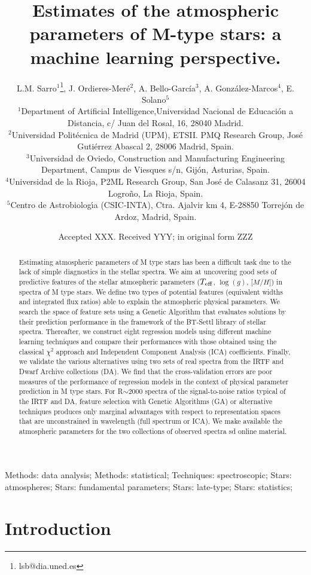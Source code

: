\documentclass[a4paper,fleqn,usenatbib]{mnras}
\title[Estimating the atmospheric parameters of M-type
  stars]{Estimates of the atmospheric parameters of M-type stars: a
  machine learning perspective.}
\author[L. M. Sarro et al.]
          {
L.M. Sarro$^{1}$\thanks{lsb@dia.uned.es},
J. Ordieres-Mer\'e$^{2}$,       
A. Bello-Garc\'ia$^{3}$, 
A. Gonz\'alez-Marcos$^{4}$, 
E. Solano$^{5}$
\\
$^{1}$Department of Artificial Intelligence,Universidad Nacional de Educaci\'{o}n a Distancia, c/ Juan del Rosal, 16, 28040 Madrid.\\
$^{2}$Universidad Polit\'{e}cnica de Madrid (UPM), ETSII. PMQ Research Group, Jos\'{e} Guti\'{e}rrez Abascal 2, 28006 Madrid, Spain. \\
$^{3}$Universidad de Oviedo, Construction and Manufacturing Engineering Department, Campus de Viesques s/n, Gij\'{o}n, Asturias, Spain. \\
$^{4}$Universidad de la Rioja, P2ML Research Group, San Jos\'{e} de Calasanz 31, 26004 Logro\~{n}o, La Rioja, Spain. \\
$^{5}$Centro de Astrobiolog\'{\i}a (CSIC-INTA), Ctra. Ajalvir km 4, E-28850 Torrejón de Ardoz, Madrid, Spain.\\
}
\date{Accepted XXX. Received YYY; in original form ZZZ}
\newcommand{\defindent}{\setlength{\parindent}{4ex}}
\begin{document}
 
\label{firstpage}
\pagerange{\pageref{firstpage}--\pageref{lastpage}}
\maketitle

\begin{abstract}
    Estimating atmospheric parameters of M type stars has been a
    difficult task due to the lack of simple diagnostics in the
    stellar spectra.  We aim at uncovering good sets of predictive
    features of the stellar atmospheric parameters ($T_{\rm eff}$,
    $\log(g)$, [$M/H$]) in spectra of M type stars. We define two types
    of potential features (equivalent widths and integrated flux
    ratios) able to explain the atmospheric physical parameters. We
    search the space of feature sets using a Genetic Algorithm that
    evaluates solutions by their prediction performance in the
    framework of the BT-Settl library of stellar spectra. Thereafter,
    we construct eight regression models using different machine
    learning techniques and compare their performances with those
    obtained using the classical $\chi^2$ approach and Independent
    Component Analysis (ICA) coefficients. Finally, we validate the
    various alternatives using two sets of real spectra from the IRTF
    and Dwarf Archive collections (DA).  We find that the cross-validation
    errors are poor measures of the performance of regression models
    in the context of physical parameter prediction in M type
    stars. For R$\sim$2000 spectra of the signal-to-noise ratios
    typical of the IRTF and DA, feature
    selection with Genetic Algorithms (GA) or alternative techniques
    produces only marginal advantages with respect to representation
    spaces that are unconstrained in wavelength (full spectrum or
    ICA). We make available the atmospheric parameters for the two
    collections of observed spectra sd online material.
    
\end{abstract}


\begin{keywords}
Methods: data analysis; Methods: statistical;
     Techniques: spectroscopic; Stars: atmospheres; Stars: fundamental
     parameters; Stars: late-type; Stars: statistics;
\end{keywords}

%

\defindent{}

\section{Introduction}
\label{sec:intro}

\end{document}
